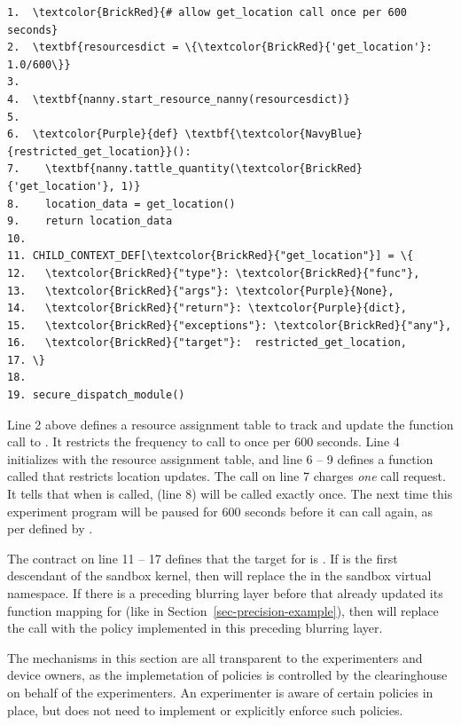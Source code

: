 \begin{Verbatim}
1.  \textcolor{BrickRed}{# allow get_location call once per 600 seconds}
2.  \textbf{resourcesdict = \{\textcolor{BrickRed}{'get_location'}: 1.0/600\}} 
3.
4.  \textbf{nanny.start_resource_nanny(resourcesdict)}
5.
6.  \textcolor{Purple}{def} \textbf{\textcolor{NavyBlue}{restricted_get_location}}():
7.    \textbf{nanny.tattle_quantity(\textcolor{BrickRed}{'get_location'}, 1)}
8.    location_data = get_location()
9.    return location_data
10.
11. CHILD_CONTEXT_DEF[\textcolor{BrickRed}{"get_location"}] = \{
12.   \textcolor{BrickRed}{"type"}: \textcolor{BrickRed}{"func"},
13.   \textcolor{BrickRed}{"args"}: \textcolor{Purple}{None},
14.   \textcolor{BrickRed}{"return"}: \textcolor{Purple}{dict},
15.   \textcolor{BrickRed}{"exceptions"}: \textcolor{BrickRed}{"any"},
16.   \textcolor{BrickRed}{"target"}:  restricted_get_location,
17. \}
18. 
19. secure_dispatch_module()
\end{Verbatim}

Line 2 above defines a resource assignment table  to track and update 
the function call to . It restricts the frequency to 
call  to once per 600 seconds. Line 4 initializes  
with the resource assignment table, and line 6 -- 9 defines a 
function called  that restricts location updates. 
The  call on line 7 charges \textit{one}  call 
request. It tells  that when  
is called,  (line 8) will be called exactly once. The
next time this experiment program 
will be paused for 600 seconds before it can call  again,
as per defined by .

The contract on line 11 -- 17 defines that the target
for  is . If 
 is the first descendant of the sandbox kernel, then
 will replace the 
in the sandbox virtual namespace. If there is a preceding blurring layer 
before  that already updated its 
function mapping for  (like   
in Section~\ref{sec-precision-example}), then
 will replace the  call
with the policy implemented in this preceding blurring layer.

\bigskip
The mechanisms in this section are all transparent to the experimenters 
and device owners, as the implemetation of policies is controlled by the 
clearinghouse on behalf of the experimenters. An experimenter is aware 
of certain policies in place, but does not need to implement or explicitly
enforce such policies. 